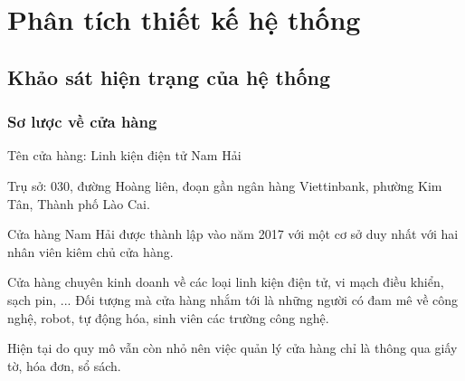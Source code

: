 \chapter{Phân tích thiết kế hệ thống}
\section{Khảo sát hiện trạng của hệ thống}
\subsection{Sơ lược về cửa hàng}
Tên cửa hàng: Linh kiện điện tử Nam Hải\par
Trụ sở: 030, đường Hoàng liên, đoạn gần ngân hàng Viettinbank, phường Kim Tân, Thành phố Lào Cai.\par
Cửa hàng Nam Hải được thành lập vào năm 2017 với một cơ sở duy nhất với hai nhân viên kiêm chủ cửa hàng.\par
Cửa hàng chuyên kinh doanh về các loại linh kiện điện tử, vi mạch điều khiển, sạch pin, ... Đối tượng mà cửa hàng nhắm tới là những người có đam mê về công nghệ, robot, tự động hóa, sinh viên các trường công nghệ.\par
Hiện tại do quy mô vẫn còn nhỏ nên việc quản lý cửa hàng chỉ là thông qua giấy tờ, hóa đơn, sổ sách.
